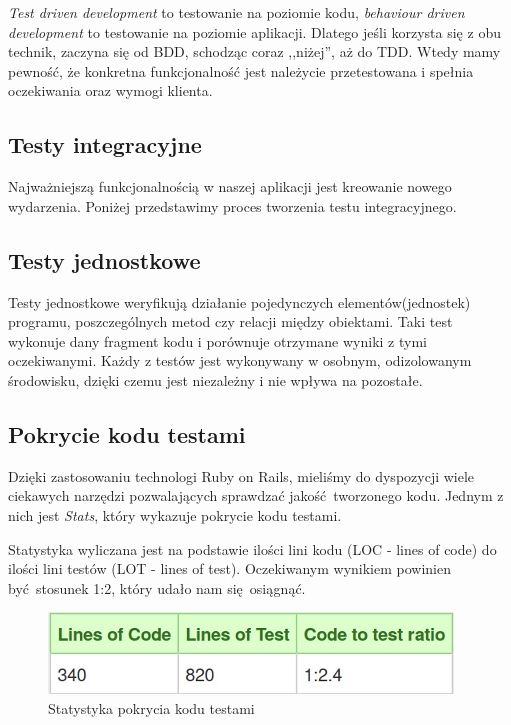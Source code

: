 \begin{itemize}
        \emph{Test driven development} to testowanie na poziomie kodu, \emph{behaviour driven development} to testowanie na poziomie aplikacji. Dlatego jeśli korzysta się z obu technik, zaczyna się od BDD, schodząc coraz ,,niżej'', aż do TDD. Wtedy mamy pewność, że konkretna funkcjonalność jest należycie przetestowana i spełnia oczekiwania oraz wymogi klienta.
    \end{itemize}

  \subsection{Testy integracyjne}
    Najważniejszą funkcjonalnością w naszej aplikacji jest kreowanie nowego wydarzenia. Poniżej przedstawimy proces tworzenia testu integracyjnego.

    
  \subsection{Testy jednostkowe}
    Testy jednostkowe weryfikują działanie pojedynczych elementów(jednostek) programu, poszczególnych metod czy relacji między obiektami. Taki test wykonuje dany fragment kodu i porównuje otrzymane wyniki z tymi oczekiwanymi. Każdy z testów jest wykonywany w osobnym, odizolowanym środowisku, dzięki czemu jest niezależny i nie wpływa na pozostałe.

    
  \clearpage
  \subsection{Pokrycie kodu testami}
    Dzięki zastosowaniu technologi Ruby on Rails, mieliśmy do dyspozycji wiele ciekawych narzędzi pozwalających sprawdzać jakość tworzonego kodu. Jednym z nich jest \emph{Stats}, który wykazuje pokrycie kodu testami.

    Statystyka wyliczana jest na podstawie ilości lini kodu (LOC - lines of code) do ilości lini testów (LOT - lines of test). Oczekiwanym wynikiem powinien być stosunek 1:2, który udało nam się osiągnąć.
    \begin{figure}[h]
      \centering
      \includegraphics[scale=0.5]{images/loc_table.png}
      \caption{Statystyka pokrycia kodu testami}
    \end{figure}

